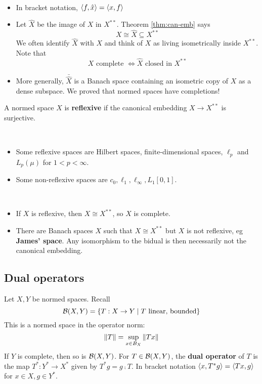 \documentclass{article}
\begin{document}
\begin{rmks}~
  \begin{itemize}
    \item In bracket notation, $\left\langle f, \hat x\right\rangle = \left\langle x, f\right\rangle$
    \item Let $\hat X$ be the image of $X$ in $X^{**}$. Theorem \ref{thm:can-emb} says
      $$X \cong \hat X \subseteq X^{**}$$
      We often identify $\hat X$ with $X$ and think of $X$ as living isometrically inside $X^{**}$. Note that
      $$X \text{ complete } \iff \hat X \text{ closed in } X^{**}$$
    \item More generally, $\bar{\hat X}$ is a Banach space containing an isometric copy of $X$ as a dense subspace. We proved that normed spaces have completions!
  \end{itemize}
\end{rmks}

\begin{dfn*}
  A normed space $X$ is {\bf reflexive} if the canonical embedding $X \to X^{**}$ is surjective.
\end{dfn*}

\begin{egs*}~
  \begin{itemize}
    \item Some reflexive spaces are Hilbert spaces, finite-dimensional spaces, $\ell_p$ and $L_p(\mu)$ for $1 < p < \infty$.
    \item Some non-reflexive spaces are $c_0, \ell_1, \ell_\infty, L_1[0, 1]$.
  \end{itemize}
\end{egs*}

\begin{rmks}~
  \begin{itemize}
  \item If $X$ is reflexive, then $X \cong X^{**}$, so $X$ is complete.
  \item There are Banach spaces $X$ such that $X \cong X^{**}$ but $X$ is not reflexive, eg {\bf James' space}. Any isomorphism to the bidual is then necessarily not the canonical embedding.
  \end{itemize}
\end{rmks}

\subsection{Dual operators}

\newlec

Let $X, Y$ be normed spaces. Recall
$$\mathcal B(X, Y) = \{T : X \to Y \mid T \text{ linear, bounded}\}$$
This is a normed space in the operator norm:
$$\left\lVert T\right\rVert = \sup_{x \in B_X} \left\lVert Tx\right\rVert$$
If $Y$ is complete, then so is $\mathcal B(X, Y)$. For $T \in \mathcal B(X, Y)$, the {\bf dual operator} of $T$ is the map $T^* : Y^* \to X^*$ given by $T^*g = g \comp T$. In bracket notation $\left\langle x, T^*g\right\rangle = \left\langle Tx, g\right\rangle$ for $x \in X, g \in Y^*$.
\end{document}
